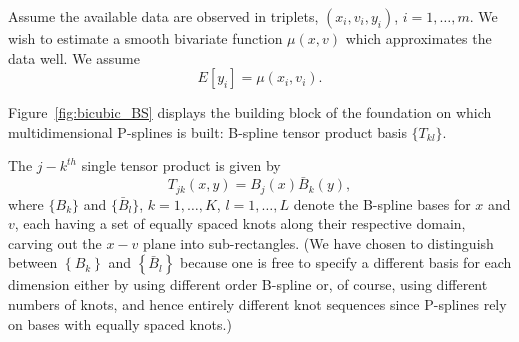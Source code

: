 \documentclass[12pt]{article}
\theoremstyle{definition}
\begin{document}
Assume the available data are observed in triplets, $\left(x_i,v_i,y_i\right)$, $i=1,\dots,m$. We wish to estimate a smooth bivariate function $\mu\left(x,v\right)$ which approximates the data well. We assume
\begin{equation} \label{eq:2D_intercept_only_model}
E\left[ y_i \right] = \mu\left(x_i,v_i\right).
\end{equation}

Figure~\ref{fig:bicubic_BS} displays the building block of the foundation on which multidimensional P-splines is built: B-spline tensor product basis $\big\{ T_{kl}\big\}$.

The $j-k^{th}$ single tensor product is given by
\[
T_{jk}\left(x,y\right) = B_j\left(x\right)\bar{B}_k\left(y\right),
\]
where 
$\big\{ B_{k}\big\}$ and $\big\{ \bar{B}_{l}\big\}$, $k=1,\dots,K$, $l=1,\dots,L$ denote the B-spline bases for $x$ and $v$, each having a set of equally spaced knots along their respective domain, carving out the $x-v$ plane into sub-rectangles. (We have chosen to distinguish between $\left\{ B_k \right\}$ and $\left\{ \bar{B}_l \right\}$ because one is free to specify a different basis for each dimension either by using different order B-spline or, of course, using different numbers of knots, and hence entirely different knot sequences since P-splines rely on bases with equally spaced knots.)
\end{document}
